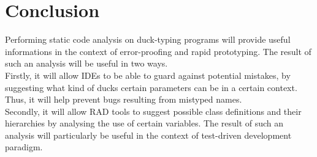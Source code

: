 \documentclass[a4paper,12pt]{article}
\begin{document}
\section{Conclusion}
Performing static code analysis on duck-typing programs will provide useful 
informations in the context of error-proofing and rapid prototyping. The 
result of such an analysis will be useful in two ways.\\ 
Firstly, it will allow IDEs to be able to guard against potential mistakes, 
by suggesting what kind of ducks certain parameters can be in a certain 
context. Thus, it will help prevent bugs resulting from mistyped names.\\
Secondly, it will allow RAD tools to suggest possible class definitions and 
their hierarchies by analysing the use of certain variables. The result of 
such an analysis will particularly be useful in the context of test-driven 
development paradigm.\\
\end{document}
